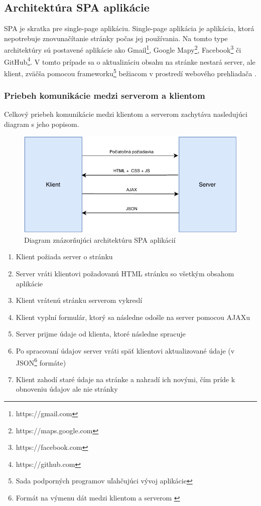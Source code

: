 \subsection{Architektúra SPA aplikácie}
SPA je skratka pre single-page aplikáciu. Single-page aplikácia je aplikácia, ktorá nepotrebuje znovunačítanie stránky počas jej používania. Na tomto type architektúry sú postavené aplikácie ako Gmail\footnote{https://gmail.com}, Google Mapy\footnote{https://maps.google.com}, Facebook\footnote{https://facebook.com} či GitHub\footnote{https://github.com}. V tomto prípade sa o aktualizáciu obsahu na stránke nestará server, ale klient, zväčša pomocou frameworku\footnote{Sada podporných programov uľahčujúci vývoj aplikácie} bežiacom v prostredí webového prehliadača \cite{spa-vs-mpa-3}.

\subsubsection*{Priebeh komunikácie medzi serverom a klientom}
Celkový priebeh komunikácie medzi klientom a serverom zachytáva nasledujúci diagram s jeho popisom.

\begin{figure}
	\includegraphics[width=1.0\textwidth]{media/navrh/SPA.pdf}
	\caption{Diagram znázorňujúci architektúru SPA aplikácií}\label{spa-graf}
\end{figure}

\begin{enumerate}
	\item Klient požiada server o stránku
	\item Server vráti klientovi požadovanú HTML stránku so všetkým obsahom aplikácie
	\item Klient vrátenú stránku serverom vykreslí
	\item Klient vyplní formulár, ktorý sa následne odošle na server pomocou AJAXu
	\item Server prijme údaje od klienta, ktoré následne spracuje
	\item Po spracovaní údajov server vráti späť klientovi aktualizované údaje (v JSON\footnote{Formát na výmenu dát medzi klientom a serverom \cite{co-je-json} } formáte)
	\item Klient zahodí staré údaje na stránke a nahradí ich novými, čím príde k obnoveniu údajov ale nie stránky
\end{enumerate}


